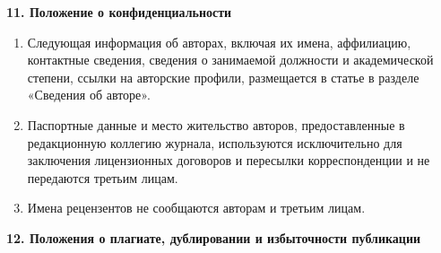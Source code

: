 \noindent

{\bf 11. Положение о конфиденциальности}

\begin{enumerate}

\item[1.] Следующая информация об авторах, включая их имена, аффилиацию, контактные сведения, сведения о занимаемой должности и академической степени, ссылки на авторские профили, размещается в статье в разделе «Сведения об авторе».

\item[2.]

Паспортные данные и место жительство авторов, предоставленные в редакционную коллегию журнала, используются исключительно для заключения лицензионных договоров и пересылки корреспонденции и не передаются третьим лицам.

\item[3.]

Имена рецензентов не сообщаются авторам и третьим лицам.

\end{enumerate}





\noindent

{\bf 12. Положения о плагиате, дублировании и избыточности публикации}




